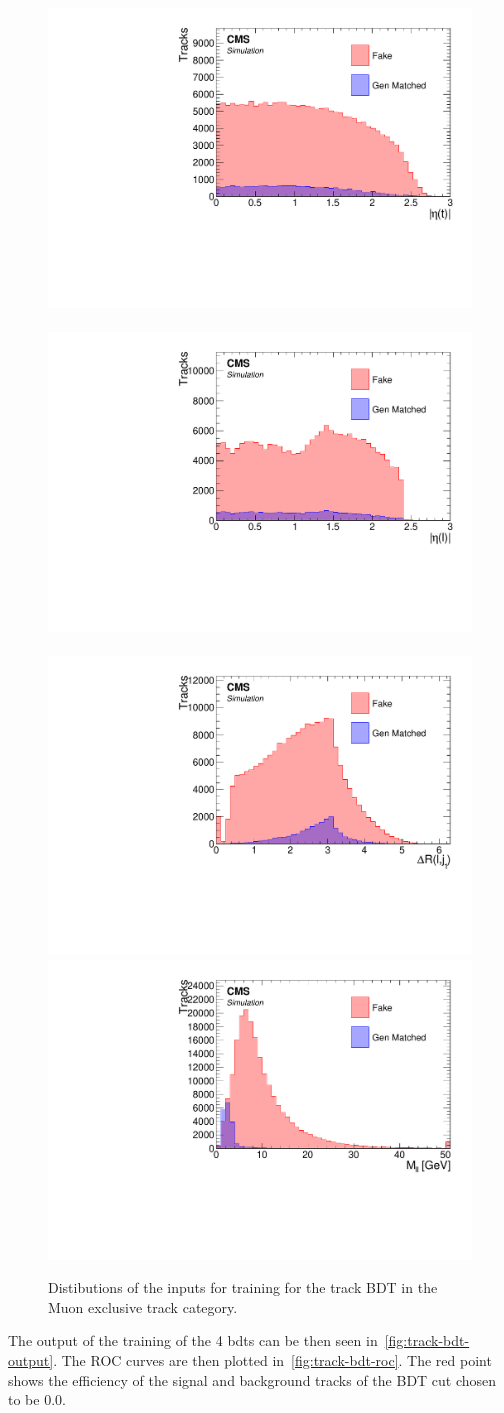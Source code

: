 \begin{figure}[!htb]
\includegraphics[width=0.32\linewidth]{plots/track_bdt_inputs_muons/none_abs_track.Eta___.pdf} \,
\includegraphics[width=0.32\linewidth]{plots/track_bdt_inputs_muons/none_abs_lepton.Eta___.pdf} \,
\includegraphics[width=0.32\linewidth]{plots/track_bdt_inputs_muons/none_deltaRLJ.pdf}  \\


\includegraphics[width=0.32\linewidth]{plots/track_bdt_inputs_muons/none_invMass.pdf}  \\


\caption[Muon track BDT training inputs]{Distibutions of the inputs for training for the track BDT in the Muon exclusive track category.}
\label{fig:muon-track-bdt-inputs}
\end{figure}

The output of the training of the 4 \glspl{bdt} can be then seen in~\ref{fig:track-bdt-output}. The ROC curves are then plotted in~\ref{fig:track-bdt-roc}. The red point shows the efficiency of the signal and background tracks of the BDT cut chosen to be 0.0.

